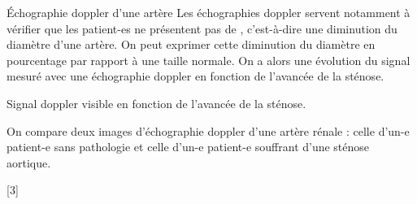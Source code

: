 \begin{doc}{Échographie doppler d'une artère}
  Les échographies doppler servent notamment à vérifier que les patient-es ne présentent pas de , c'est-à-dire une diminution du diamètre d'une artère.
  On peut exprimer cette diminution du diamètre en pourcentage par rapport à une taille normale.
  On a alors une évolution du signal mesuré avec une échographie doppler en fonction de l'avancée de la sténose.
  \begin{center}
    
    Signal doppler visible en fonction de l'avancée de la sténose.
  \end{center}

  On compare deux images d'échographie doppler d'une artère rénale : celle d'un-e patient-e sans pathologie et celle d'un-e patient-e souffrant d'une sténose aortique.
  
  \begin{center}
    
  \end{center}
\end{doc}


[3]